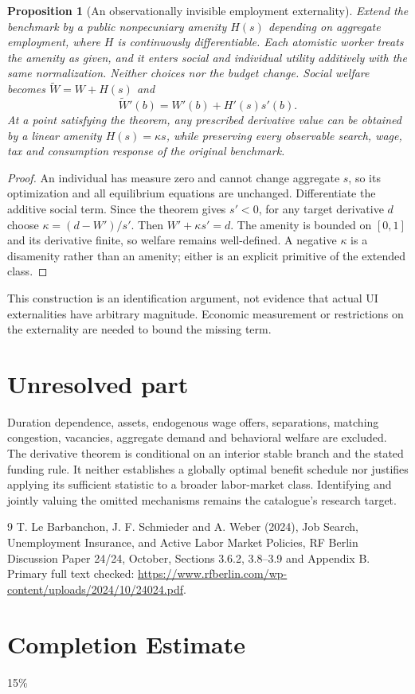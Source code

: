 \documentclass[11pt]{article}
\newtheorem{proposition}{Proposition}
\theoremstyle{definition}
\begin{document}
\begin{proposition}[An observationally invisible employment externality]
Extend the benchmark by a public nonpecuniary amenity $H(s)$ depending on aggregate employment, where $H$ is continuously differentiable. Each atomistic worker treats the amenity as given, and it enters social and individual utility additively with the same normalization. Neither choices nor the budget change. Social welfare becomes $\widetilde W=W+H(s)$ and
\[
 \widetilde W'(b)=W'(b)+H'(s)s'(b).
\]
At a point satisfying the theorem, any prescribed derivative value can be obtained by a linear amenity $H(s)=\kappa s$, while preserving every observable search, wage, tax and consumption response of the original benchmark.
\end{proposition}
\begin{proof}
An individual has measure zero and cannot change aggregate $s$, so its optimization and all equilibrium equations are unchanged. Differentiate the additive social term. Since the theorem gives $s'<0$, for any target derivative $d$ choose $\kappa=(d-W')/s'$. Then $W'+\kappa s'=d$. The amenity is bounded on $[0,1]$ and its derivative finite, so welfare remains well-defined. A negative $\kappa$ is a disamenity rather than an amenity; either is an explicit primitive of the extended class.
\end{proof}
This construction is an identification argument, not evidence that actual UI externalities have arbitrary magnitude. Economic measurement or restrictions on the externality are needed to bound the missing term.

\section*{Unresolved part}
Duration dependence, assets, endogenous wage offers, separations, matching congestion, vacancies, aggregate demand and behavioral welfare are excluded. The derivative theorem is conditional on an interior stable branch and the stated funding rule. It neither establishes a globally optimal benefit schedule nor justifies applying its sufficient statistic to a broader labor-market class. Identifying and jointly valuing the omitted mechanisms remains the catalogue's research target.
\begin{thebibliography}{9}
 T. Le Barbanchon, J. F. Schmieder and A. Weber (2024), Job Search, Unemployment Insurance, and Active Labor Market Policies, RF Berlin Discussion Paper 24/24, October, Sections 3.6.2, 3.8--3.9 and Appendix B. Primary full text checked: \url{https://www.rfberlin.com/wp-content/uploads/2024/10/24024.pdf}.
\end{thebibliography}

\section{Completion Estimate}
15\%
\end{document}
